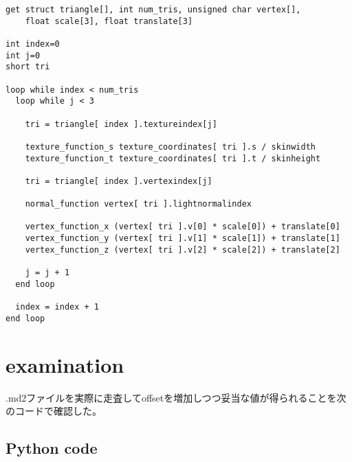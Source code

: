 \documentclass[uplatex,dvipdfmx]{jsarticle} \usepackage{amsmath,amssymb,bm}
\begin{document}
\begin{verbatim}
get struct triangle[], int num_tris, unsigned char vertex[],
    float scale[3], float translate[3]

int index=0
int j=0
short tri

loop while index < num_tris
  loop while j < 3

    tri = triangle[ index ].textureindex[j]

    texture_function_s texture_coordinates[ tri ].s / skinwidth
    texture_function_t texture_coordinates[ tri ].t / skinheight

    tri = triangle[ index ].vertexindex[j]

    normal_function vertex[ tri ].lightnormalindex

    vertex_function_x (vertex[ tri ].v[0] * scale[0]) + translate[0]
    vertex_function_y (vertex[ tri ].v[1] * scale[1]) + translate[1]
    vertex_function_z (vertex[ tri ].v[2] * scale[2]) + translate[2]

    j = j + 1
  end loop

  index = index + 1
end loop
\end{verbatim}


\section*{examination}

.md2ファイルを実際に走査してoffsetを増加しつつ妥当な値が得られることを次のコードで確認した。

\subsection*{Python code}



\vspace{\baselineskip}
\begin{paracol}{2}
\switchcolumn
\end{paracol}
\end{document}
